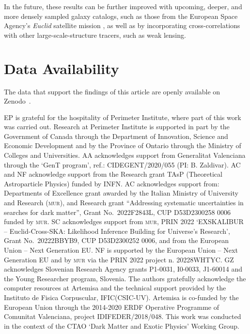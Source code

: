 \documentclass[aps,prd,a4paper,reprint,nofootinbib,superscriptaddress,floatfix,preprintnumbers]{revtex4-2}
\begin{document}
In the future, these results can be further improved with upcoming, deeper, and more densely sampled galaxy catalogs, such as those from the European Space Agency's \textit{Euclid} satellite mission \cite{2024arXiv240513491E}, as well as by incorporating cross-correlations with other large-scale-structure tracers, such as weak lensing.

\section*{Data Availability}
The data that support the findings of this article are openly available on Zenodo~\cite{pinetti_2025_17704724}.

\medskip

\begin{acknowledgments}
EP is grateful for the hospitality of Perimeter Institute, where part of this work was carried out. Research at Perimeter Institute is supported in part by the Government of Canada through the Department of Innovation, Science and Economic Development and by the Province of Ontario through the Ministry of Colleges and Universities. 
AA acknowledges support from Generalitat Valenciana through the `GenT program', ref.: CIDEGENT/2020/055 (PI: B. Zaldivar).
AC and NF acknowledge support from the Research grant TAsP (Theoretical Astroparticle Physics) funded by INFN. AC acknowledges support from: Departments of Excellence grant awarded by the Italian Ministry of University and Research (\textsc{mur}), and Research
grant ``Addressing systematic uncertainties in searches for
dark matter'', Grant No.\ 2022F2843L, CUP D53D2300258 0006 funded by \textsc{mur}. SC acknowledges support from \textsc{mur}, PRIN 2022 `EXSKALIBUR – Euclid-Cross-SKA: Likelihood Inference Building for Universe's Research', Grant No.\ 20222BBYB9, CUP D53D2300252 0006, and from the European Union -- Next Generation EU. NF is supported by the European Union – Next Generation EU and by \textsc{mur} via the PRIN 2022 project n. 20228WHTYC. GZ acknowledges Slovenian Research Agency grants P1-0031, I0-0033, J1-60014 and the Young Researcher program, Slovenia. 
The authors gratefully acknowledge the computer resources at Artemisa and the technical support provided by the Instituto de Fisica Corpuscular, IFIC(CSIC-UV). Artemisa is co-funded by the European Union through the 2014-2020 ERDF Operative Programme of Comunitat Valenciana, project IDIFEDER/2018/048. This work was conducted in the context of the CTAO
‘Dark Matter and Exotic Physics’ Working Group.


\end{acknowledgments}
\end{document}
